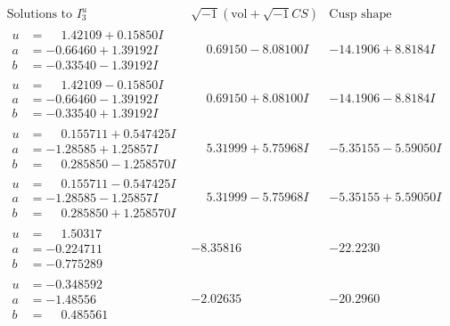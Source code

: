 \documentclass[1p]{elsarticle_modified}
\theoremstyle{definition}
\newcommand{\I}{\sqrt{-1}}
\begin{document}
$$\begin{array}{c|c|c}  
\text{Solutions to }I^u_{3}& \I (\text{vol} + \sqrt{-1}CS) & \text{Cusp shape}\\
 \hline 
\begin{aligned}
u &= \phantom{-}1.42109 + 0.15850 I \\
a &= -0.66460 + 1.39192 I \\
b &= -0.33540 - 1.39192 I\end{aligned}
 & \phantom{-}0.69150 - 8.08100 I & -14.1906 + 8.8184 I \\ \hline\begin{aligned}
u &= \phantom{-}1.42109 - 0.15850 I \\
a &= -0.66460 - 1.39192 I \\
b &= -0.33540 + 1.39192 I\end{aligned}
 & \phantom{-}0.69150 + 8.08100 I & -14.1906 - 8.8184 I \\ \hline\begin{aligned}
u &= \phantom{-}0.155711 + 0.547425 I \\
a &= -1.28585 + 1.25857 I \\
b &= \phantom{-}0.285850 - 1.258570 I\end{aligned}
 & \phantom{-}5.31999 + 5.75968 I & -5.35155 - 5.59050 I \\ \hline\begin{aligned}
u &= \phantom{-}0.155711 - 0.547425 I \\
a &= -1.28585 - 1.25857 I \\
b &= \phantom{-}0.285850 + 1.258570 I\end{aligned}
 & \phantom{-}5.31999 - 5.75968 I & -5.35155 + 5.59050 I \\ \hline\begin{aligned}
u &= \phantom{-}1.50317\phantom{ +0.000000I} \\
a &= -0.224711\phantom{ +0.000000I} \\
b &= -0.775289\phantom{ +0.000000I}\end{aligned}
 & -8.35816\phantom{ +0.000000I} & -22.2230\phantom{ +0.000000I} \\ \hline\begin{aligned}
u &= -0.348592\phantom{ +0.000000I} \\
a &= -1.48556\phantom{ +0.000000I} \\
b &= \phantom{-}0.485561\phantom{ +0.000000I}\end{aligned}
 & -2.02635\phantom{ +0.000000I} & -20.2960\phantom{ +0.000000I} \\ \hline\begin{aligned}

\end{aligned}
\end{array}$$
\end{document}
